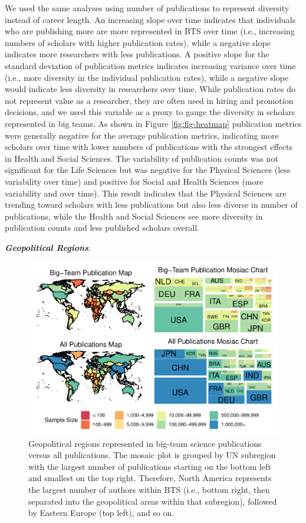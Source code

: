 \documentclass[
  man,floatsintext]{apa6}
\begin{document}
We used the same analyses using number of publications to represent diversity instead of career length. An increasing slope over time indicates that
individuals who are publishing more are more represented in BTS over
time (i.e., increasing numbers of scholars with higher publication
rates), while a negative slope indicates more researchers with less
publications. A positive slope for the standard deviation of publication
metrics indicates increasing variance over time (i.e., more diversity in
the individual publication rates), while a negative slope would indicate
less diversity in researchers over time. While publication rates do not
represent value as a researcher, they are often used in hiring and
promotion decisions, and we used this variable as a proxy to gauge the
diversity in scholars represented in big teams. As shown in Figure
\ref{fig:fig-heatmap} publication metrics were generally negative for
the average publication metrics, indicating more scholars over time with
lower numbers of publications with the strongest effects in Health and
Social Sciences. The variability of publication counts was not
significant for the Life Sciences but was negative for the Physical
Sciences (less variability over time) and positive for Social and Health
Sciences (more variability and over time). This result indicates that
the Physical Sciences are trending toward scholars with less
publications but also less diverse in number of publications, while the
Health and Social Sciences see more diversity in publication counts and
less published scholars overall.

\textbf{\emph{Geopolitical Regions}}.

\begin{figure}
\centering
\includegraphics{manuscript_scopus_files/figure-latex/fig-map-both-1.pdf}
\caption{\label{fig:fig-map-both}Geopolitical regions represented in big-team science publications versus all publications. The mosaic plot is grouped by UN subregion with the largest number of publications starting on the bottom left and smallest on the top right. Therefore, North America represents the largest number of authors within BTS (i.e., bottom right, then separated into the geopolitical areas within that subregion), followed by Eastern Europe (top left), and so on.}
\end{figure}
\end{document}

